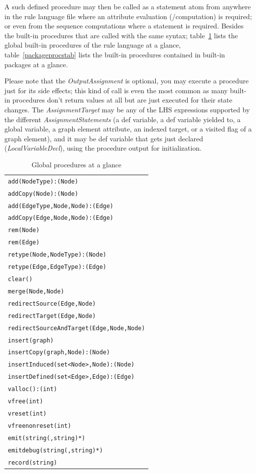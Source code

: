 A such defined procedure may then be called as a statement atom from anywhere in the rule language file where an attribute evaluation (/computation) is required; or even from the sequence computations where a statement is required.
Besides the built-in procedures that are called with the same syntax;
table~\ref{procstab} lists the global built-in procedures of the rule language at a glance,
table~\ref{packageprocstab} lists the built-in procedures contained in built-in packages at a glance.

Please note that the \emph{OutputAssignment} is optional, you may execute a procedure just for its side effects; this kind of call is even the most common as many built-in procedures don't return values at all but are just executed for their state changes.
The \emph{AssignmentTarget} may be any of the LHS expressions supported by the different \emph{AssignmentStatements} (a def variable, a def variable yielded to, a global variable, a graph element attribute, an indexed target, or a visited flag of a graph element), and it may be def variable that gets just declared (\emph{LocalVariableDecl}), using the procedure output for initialization.

\begin{table}[htbp]
\centering
\begin{tabular}{|l|}
\hline
\texttt{add(NodeType):(Node)}\\
\texttt{addCopy(Node):(Node)}\\
\texttt{add(EdgeType,Node,Node):(Edge)}\\
\texttt{addCopy(Edge,Node,Node):(Edge)}\\
\texttt{rem(Node)}\\
\texttt{rem(Edge)}\\
\texttt{retype(Node,NodeType):(Node)}\\
\texttt{retype(Edge,EdgeType):(Edge)}\\
\texttt{clear()}\\
\hline
\texttt{merge(Node,Node)}\\
\texttt{redirectSource(Edge,Node)}\\
\texttt{redirectTarget(Edge,Node)}\\
\texttt{redirectSourceAndTarget(Edge,Node,Node)}\\
\hline
\texttt{insert(graph)}\\
\texttt{insertCopy(graph,Node):(Node)}\\
\texttt{insertInduced(set<Node>,Node):(Node)}\\
\texttt{insertDefined(set<Edge>,Edge):(Edge)}\\
\hline
\texttt{valloc():(int)}\\
\texttt{vfree(int)}\\
\texttt{vreset(int)}\\
\texttt{vfreenonreset(int)}\\
\hline
\texttt{emit(string(,string)*)}\\
\texttt{emitdebug(string(,string)*)}\\
\texttt{record(string)}\\
\hline
\end{tabular}
\caption{Global procedures at a glance}
\label{procstab}
\end{table}

